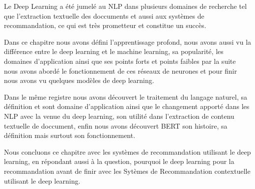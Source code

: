 \par Le Deep Learning a été jumelé au NLP dans plusieurs domaines de recherche tel que l'extraction textuelle des doccuments et aussi aux systèmes de recommandation, ce qui est très prometteur et constitue un succès. 

\par Dans ce chapitre nous avons défini l'apprentissage profond, nous avons aussi vu la différence entre le deep learning et le machine learning, sa popularité, les domaines d'application ainsi que ses points forts et points faibles par la suite nous avons abordé le fonctionnement de ces réseaux de neurones et pour finir nous avons vu quelques modèles de deep learning.
\par Dans le même registre nous avons découvert le traitement du langage naturel, sa définition et sont domaine d'application ainsi que le changement apporté dans les NLP avec la venue du deep learning, son utilité dans l'extraction de contenu textuelle de doccument, enfin nous avons découvert BERT son histoire, sa définition mais surtout son fonctionnement.

\par Nous concluons ce chapitre avec les systèmes de recommandation utilisant le deep learning, en répondant aussi à la question, pourquoi le deep learning pour la recommandation avant de finir avec les Sytèmes de Recommandation contextuelle utilisant le deep learning.